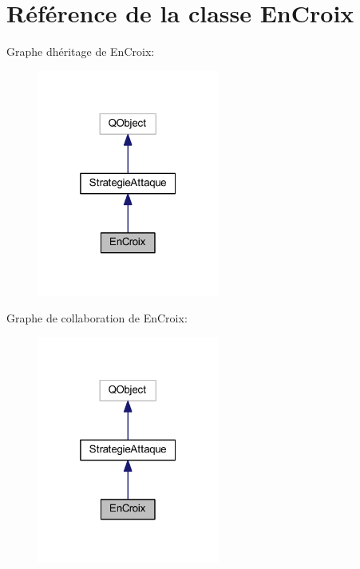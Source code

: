 \hypertarget{class_en_croix}{}\section{Référence de la classe En\+Croix}
\label{class_en_croix}


Graphe d\textquotesingle{}héritage de En\+Croix\+:
\nopagebreak
\begin{figure}[H]
\begin{center}
\leavevmode
\includegraphics[width=169pt]{class_en_croix__inherit__graph}
\end{center}
\end{figure}


Graphe de collaboration de En\+Croix\+:
\nopagebreak
\begin{figure}[H]
\begin{center}
\leavevmode
\includegraphics[width=169pt]{class_en_croix__coll__graph}
\end{center}
\end{figure}
